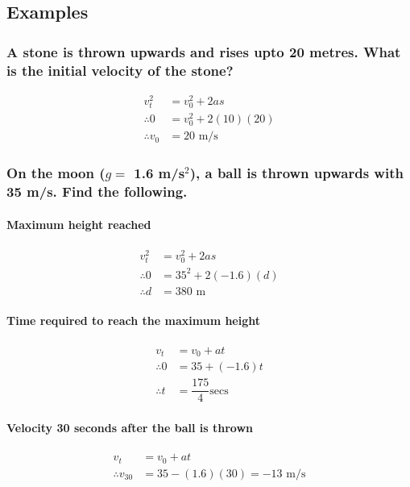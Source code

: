 \documentclass[fleqn]{article}
\begin{document}
\subsection{Examples}

\subsubsection{A stone is thrown upwards and rises upto 20 metres. What is the initial velocity of the stone?}

\begin{align*}
	v_t^2 &= v_0^2 + 2 a s \\
	\therefore 0 &= v_0^2 + 2(10)(20)\\
	\therefore v_0 &= 20 \text{ m/s}
\end{align*}

\subsubsection{On the moon ($g =$ 1.6 m/s$^2$), a ball is thrown upwards with 35 m/s. Find the following.}

\paragraph{Maximum height reached}

\begin{align*}
	v_t^2 &= v_0^2 + 2 a s \\
	\therefore 0 &= 35^2 + 2(-1.6)(d)\\
	\therefore d &= 380 \text{ m}
\end{align*}

\paragraph{Time required to reach the maximum height}

\begin{align*}
	v_t &= v_0 + a t \\
	\therefore 0 &= 35 + (-1.6)t \\
	\therefore t &= \dfrac{175}{4} \text{secs}
\end{align*}

\paragraph{Velocity 30 seconds after the ball is thrown}

\begin{align*}
	v_t &= v_0 + a t \\
	\therefore v_{30} &= 35 -(1.6)(30) = -13 \text{ m/s}
\end{align*}
\end{document}
